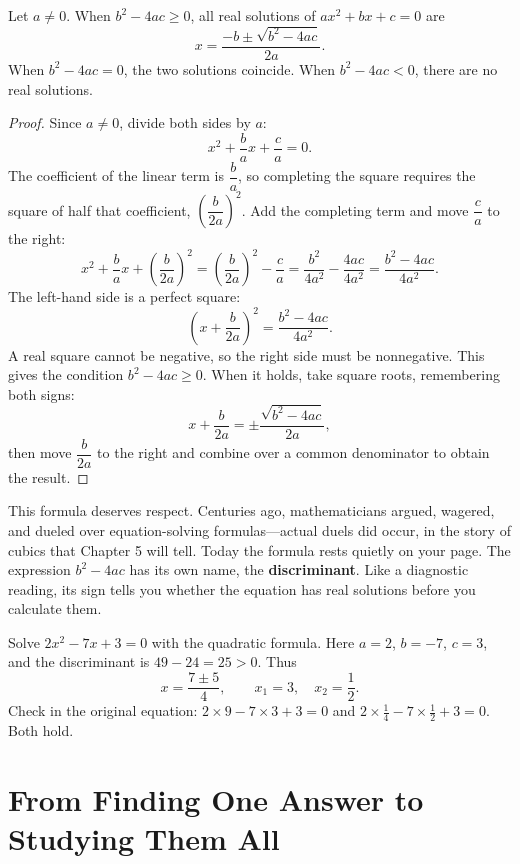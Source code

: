 \begin{dingli}
Let $a \neq 0$. When $b^2 - 4ac \geq 0$, all real solutions of $ax^2 + bx + c = 0$ are
\[
x = \frac{-b \pm \sqrt{b^2 - 4ac}}{2a}.
\]
When $b^2 - 4ac = 0$, the two solutions coincide. When $b^2 - 4ac < 0$, there are no real solutions.
\end{dingli}

\begin{proof}
Since $a \neq 0$, divide both sides by $a$:
\[
x^2 + \frac{b}{a}x + \frac{c}{a} = 0.
\]
The coefficient of the linear term is $\dfrac{b}{a}$, so completing the square requires the square of half that coefficient, $\left(\dfrac{b}{2a}\right)^2$. Add the completing term and move $\dfrac{c}{a}$ to the right:
\[
x^2 + \frac{b}{a}x + \left(\frac{b}{2a}\right)^2 = \left(\frac{b}{2a}\right)^2 - \frac{c}{a}
= \frac{b^2}{4a^2} - \frac{4ac}{4a^2} = \frac{b^2 - 4ac}{4a^2}.
\]
The left-hand side is a perfect square:
\[
\left(x + \frac{b}{2a}\right)^2 = \frac{b^2 - 4ac}{4a^2}.
\]
A real square cannot be negative, so the right side must be nonnegative. This gives the condition $b^2 - 4ac \geq 0$. When it holds, take square roots, remembering both signs:
\[
x + \frac{b}{2a} = \pm\frac{\sqrt{b^2 - 4ac}}{2a},
\]
then move $\dfrac{b}{2a}$ to the right and combine over a common denominator to obtain the result.
\end{proof}

This formula deserves respect. Centuries ago, mathematicians argued, wagered, and dueled over equation-solving formulas---actual duels did occur, in the story of cubics that Chapter 5 will tell. Today the formula rests quietly on your page. The expression $b^2 - 4ac$ has its own name, the \textbf{discriminant}. Like a diagnostic reading, its sign tells you whether the equation has real solutions before you calculate them.

\begin{li}
Solve $2x^2 - 7x + 3 = 0$ with the quadratic formula. Here $a = 2$, $b = -7$, $c = 3$, and the discriminant is $49 - 24 = 25 > 0$. Thus
\[
x = \frac{7 \pm 5}{4},\qquad x_1 = 3,\quad x_2 = \frac{1}{2}.
\]
Check in the original equation: $2 \times 9 - 7 \times 3 + 3 = 0$ and $2 \times \frac{1}{4} - 7 \times \frac{1}{2} + 3 = 0$. Both hold.
\end{li}

\section{From Finding One Answer to Studying Them All}

